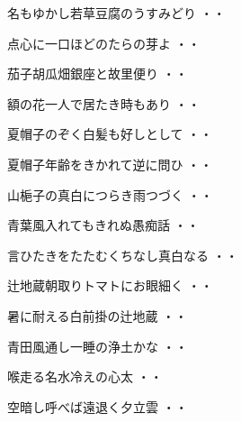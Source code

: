 \begin{shiika}名もゆかし若草豆腐のうすみどり
\hfill{・・}\end{shiika}
\vspace{0.6cm}
\begin{shiika}点心に一口ほどのたらの芽よ
\hfill{・・}\end{shiika}
\vspace{0.6cm}
\begin{shiika}茄子胡瓜畑銀座と故里便り
\hfill{・・}\end{shiika}
\vspace{0.6cm}
\begin{shiika}額の花一人で居たき時もあり
\hfill{・・}\end{shiika}
\vspace{0.6cm}
\begin{shiika}夏帽子のぞく白髪も好しとして
\hfill{・・}\end{shiika}
\vspace{0.6cm}
\begin{shiika}夏帽子年齢をきかれて逆に問ひ
\hfill{・・}\end{shiika}
\vspace{0.6cm}
\begin{shiika}山梔子の真白につらき雨つづく
\hfill{・・}\end{shiika}
\vspace{0.6cm}
\begin{shiika}青葉風入れてもきれぬ愚痴話
\hfill{・・}\end{shiika}
\vspace{0.6cm}
\begin{shiika}言ひたきをたたむくちなし真白なる
\hfill{・・}\end{shiika}
\vspace{0.6cm}
\begin{shiika}辻地蔵朝取りトマトにお眼細く
\hfill{・・}\end{shiika}
\vspace{0.6cm}
\begin{shiika}暑に耐える白前掛の辻地蔵
\hfill{・・}\end{shiika}
\vspace{0.6cm}
\begin{shiika}青田風通し一睡の浄土かな
\hfill{・・}\end{shiika}
\vspace{0.6cm}
\begin{shiika}喉走る名水冷えの心太
\hfill{・・}\end{shiika}
\vspace{0.6cm}
\begin{shiika}空暗し呼べば遠退く夕立雲
\hfill{・・}\end{shiika}
\vspace{0.6cm}

